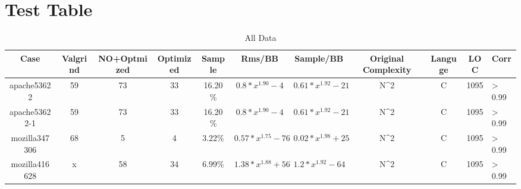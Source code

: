 \section{Test Table}
\label{sec:test table}

\begin{table*}
  \caption{All Data}
  \label{tab:commands}
  \begin{tabular}{ccccccccccl}
    \toprule
     Case & Valgrind & NO+Optmized & Optimized & Sample & Rms/BB &  Sample/BB & Original Complexity & Languge & LOC & Corr\\
    \midrule
    apache53622 & 59 & 73 & 33 & 16.20\% & $0.8*x^{1.90}-4$ & $0.61*x^{1.92}-21$ & N^2 & C & 1095 & > 0.99  \\
    apache53622-1 & 59 & 73 & 33 & 16.20\% & $0.8*x^{1.90}-4$ & $0.61*x^{1.92}-21$ & N^2 & C & 1095 & > 0.99  \\
    mozilla347306 & 68 & 5 & 4 & 3.22\% & $0.57*x^{1.75}-76$ & $0.02*x^{1.98}+25$ & N^2 & C & 1095 & > 0.99  \\
    mozilla416628 & x & 58 & 34 & 6.99\% & $1.38*x^{1.88}+56$ & $1.2*x^{1.92}-64$ & N^2 & C & 1095 & > 0.99  \\
    \bottomrule
  \end{tabular}
\end{table*}
